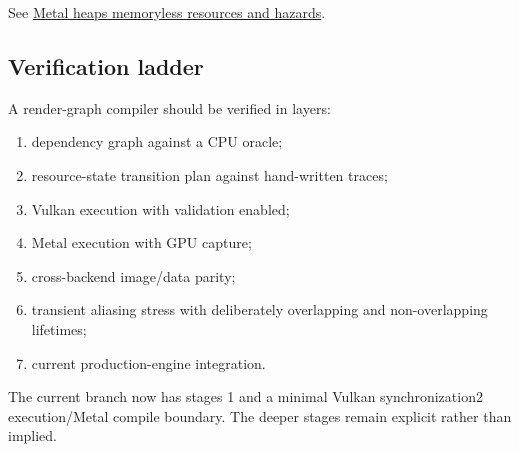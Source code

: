 See \hyperref[appendix-563b2cb23fc3]{Metal heaps memoryless resources and hazards}.

\subsection{Verification ladder}\label{verification-ladder}

A render-graph compiler should be verified in layers:

\begin{enumerate}
\def\labelenumi{\arabic{enumi}.}
\tightlist
\item
  dependency graph against a CPU oracle;
\item
  resource-state transition plan against hand-written traces;
\item
  Vulkan execution with validation enabled;
\item
  Metal execution with GPU capture;
\item
  cross-backend image/data parity;
\item
  transient aliasing stress with deliberately overlapping and non-overlapping lifetimes;
\item
  current production-engine integration.
\end{enumerate}

The current branch now has stages 1 and a minimal Vulkan synchronization2 execution/Metal compile boundary. The deeper stages remain explicit rather than implied.

